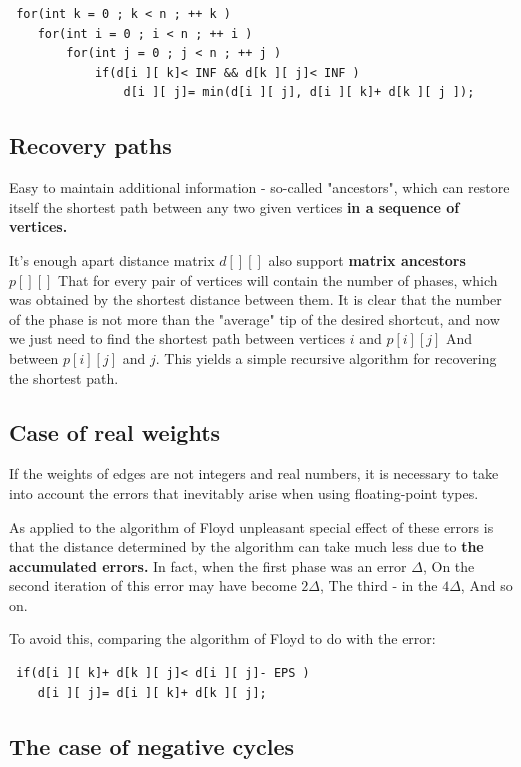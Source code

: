 \begin{verbatim}
 for(int k = 0 ; k < n ; ++ k )
    for(int i = 0 ; i < n ; ++ i )
        for(int j = 0 ; j < n ; ++ j )
            if(d[i ][ k]< INF && d[k ][ j]< INF )
                d[i ][ j]= min(d[i ][ j], d[i ][ k]+ d[k ][ j ]); 
\end{verbatim}
\subsection{ Recovery paths }

Easy to maintain additional information - so-called "ancestors", which can restore itself the shortest path between any two given vertices \textbf{in a sequence of vertices.}

It's enough apart distance matrix $d [][]$ also support \textbf{matrix ancestors} $p [][]$ That for every pair of vertices will contain the number of phases, which was obtained by the shortest distance between them. It is clear that the number of the phase is not more than the "average" tip of the desired shortcut, and now we just need to find the shortest path between vertices $i$ and $p [i][j]$ And between $p [i][j]$ and $j$. This yields a simple recursive algorithm for recovering the shortest path.

\subsection{ Case of real weights }

If the weights of edges are not integers and real numbers, it is necessary to take into account the errors that inevitably arise when using floating-point types.

As applied to the algorithm of Floyd unpleasant special effect of these errors is that the distance determined by the algorithm can take much less due to \textbf{the accumulated errors.} In fact, when the first phase was an error $\Delta$, On the second iteration of this error may have become $2 \Delta$, The third - in the $4 \Delta$, And so on.

To avoid this, comparing the algorithm of Floyd to do with the error:

\begin{verbatim}
 if(d[i ][ k]+ d[k ][ j]< d[i ][ j]- EPS )
    d[i ][ j]= d[i ][ k]+ d[k ][ j]; 
\end{verbatim}
\subsection{ The case of negative cycles }

